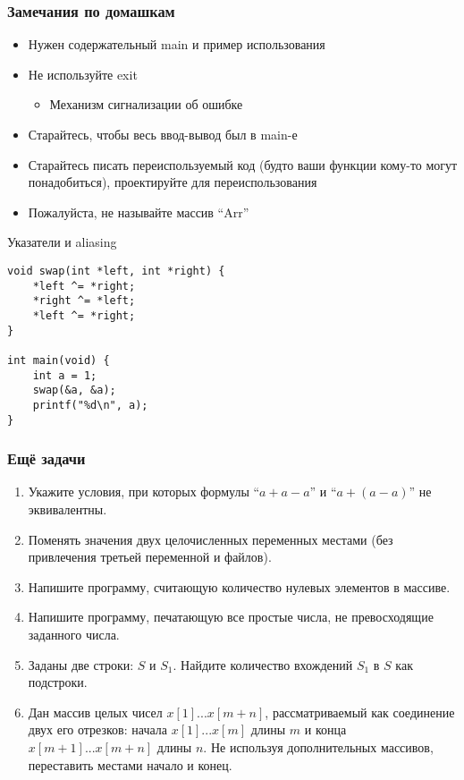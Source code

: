 \documentclass{../../slides-style}
\begin{document}
    \begin{frame}[plain]
        \titlepage
    \end{frame}

    \begin{frame}
        \frametitle{Замечания по домашкам}
        \begin{itemize}
            \item Нужен содержательный main и пример использования
            \item Не используйте exit
            \begin{itemize}
                \item Механизм сигнализации об ошибке
            \end{itemize}
            \item Старайтесь, чтобы весь ввод-вывод был в main-е
            \item Старайтесь писать переиспользуемый код (будто ваши функции кому-то могут понадобиться), проектируйте для переиспользования
            \item Пожалуйста, не называйте массив \enquote{Arr}
        \end{itemize}
    \end{frame}

    \begin{frame}[fragile]{Указатели и aliasing}
        \begin{verbatim}
void swap(int *left, int *right) {
    *left ^= *right;
    *right ^= *left;
    *left ^= *right;
}

int main(void) {
    int a = 1;
    swap(&a, &a);
    printf("%d\n", a);
}
        \end{verbatim}
    \end{frame}

    \begin{frame}
        \frametitle{Ещё задачи}
        \begin{enumerate}
            \item Укажите условия, при которых формулы ``$a + a - a$'' и ``$a + (a - a)$'' не эквивалентны.
            \item Поменять значения двух целочисленных переменных местами (без привлечения третьей переменной и файлов).
            \item Напишите программу, считающую количество нулевых элементов в массиве.
            \item Напишите программу, печатающую все простые числа, не превосходящие заданного числа.
            \item Заданы две строки: $S$ и $S_1$. Найдите количество вхождений $S_1$ в $S$ как подстроки.
            \item Дан массив целых чисел $x[1]...x[m+n]$, рассматриваемый как соединение двух его отрезков: начала $x[1]...x[m]$ длины $m$ и конца $x[m+1]...x[m+n]$ длины $n$. Не используя дополнительных массивов, переставить местами начало и конец.
        \end{enumerate}
    \end{frame}
\end{document}
